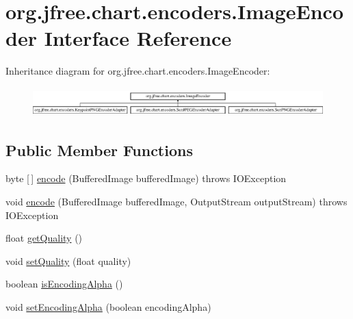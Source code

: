 \hypertarget{interfaceorg_1_1jfree_1_1chart_1_1encoders_1_1_image_encoder}{}\section{org.\+jfree.\+chart.\+encoders.\+Image\+Encoder Interface Reference}
\label{interfaceorg_1_1jfree_1_1chart_1_1encoders_1_1_image_encoder}
Inheritance diagram for org.\+jfree.\+chart.\+encoders.\+Image\+Encoder\+:\begin{figure}[H]
\begin{center}
\leavevmode
\includegraphics[height=1.127895cm]{interfaceorg_1_1jfree_1_1chart_1_1encoders_1_1_image_encoder}
\end{center}
\end{figure}
\subsection*{Public Member Functions}
\begin{DoxyCompactItemize}
\item 
byte \mbox{[}$\,$\mbox{]} \mbox{\hyperlink{interfaceorg_1_1jfree_1_1chart_1_1encoders_1_1_image_encoder_a3290449de5246d80ca626835e5dac183}{encode}} (Buffered\+Image buffered\+Image)  throws I\+O\+Exception
\item 
void \mbox{\hyperlink{interfaceorg_1_1jfree_1_1chart_1_1encoders_1_1_image_encoder_ad9396ba6a8a9c6f490a31f36f2226dac}{encode}} (Buffered\+Image buffered\+Image, Output\+Stream output\+Stream)  throws I\+O\+Exception
\item 
float \mbox{\hyperlink{interfaceorg_1_1jfree_1_1chart_1_1encoders_1_1_image_encoder_a292037d46187ca04bbd3a9362bf6ad22}{get\+Quality}} ()
\item 
void \mbox{\hyperlink{interfaceorg_1_1jfree_1_1chart_1_1encoders_1_1_image_encoder_a143bbe40d39b16192a92128696877782}{set\+Quality}} (float quality)
\item 
boolean \mbox{\hyperlink{interfaceorg_1_1jfree_1_1chart_1_1encoders_1_1_image_encoder_afd771eda4e4d50113696e241f5a34f2c}{is\+Encoding\+Alpha}} ()
\item 
void \mbox{\hyperlink{interfaceorg_1_1jfree_1_1chart_1_1encoders_1_1_image_encoder_a1f75e96b9ec512882b6d32c4f0bac3d2}{set\+Encoding\+Alpha}} (boolean encoding\+Alpha)
\end{DoxyCompactItemize}


